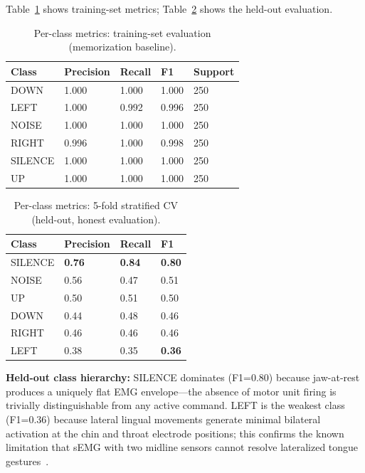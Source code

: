 \documentclass[11pt, a4paper]{article}
\begin{document}
Table~\ref{tab:perclass_train} shows training-set metrics; Table~\ref{tab:perclass_heldout} shows the held-out evaluation.

\begin{table}[h]
\centering
\caption{Per-class metrics: training-set evaluation (memorization baseline).}
\label{tab:perclass_train}
\begin{tabular}{@{}lllll@{}}
\toprule
Class & Precision & Recall & F1 & Support \\
\midrule
DOWN    & 1.000 & 1.000 & 1.000 & 250 \\
LEFT    & 1.000 & 0.992 & 0.996 & 250 \\
NOISE   & 1.000 & 1.000 & 1.000 & 250 \\
RIGHT   & 0.996 & 1.000 & 0.998 & 250 \\
SILENCE & 1.000 & 1.000 & 1.000 & 250 \\
UP      & 1.000 & 1.000 & 1.000 & 250 \\
\bottomrule
\end{tabular}
\end{table}

\begin{table}[h]
\centering
\caption{Per-class metrics: 5-fold stratified CV (held-out, honest evaluation).}
\label{tab:perclass_heldout}
\begin{tabular}{@{}llll@{}}
\toprule
Class & Precision & Recall & F1 \\
\midrule
SILENCE & \textbf{0.76} & \textbf{0.84} & \textbf{0.80} \\
NOISE   & 0.56 & 0.47 & 0.51 \\
UP      & 0.50 & 0.51 & 0.50 \\
DOWN    & 0.44 & 0.48 & 0.46 \\
RIGHT   & 0.46 & 0.46 & 0.46 \\
LEFT    & 0.38 & 0.35 & \textbf{0.36} \\
\bottomrule
\end{tabular}
\end{table}

\textbf{Held-out class hierarchy:} SILENCE dominates (F1=0.80) because jaw-at-rest produces a uniquely flat EMG envelope---the absence of motor unit firing is trivially distinguishable from any active command. LEFT is the weakest class (F1=0.36) because lateral lingual movements generate minimal bilateral activation at the chin and throat electrode positions; this confirms the known limitation that sEMG with two midline sensors cannot resolve lateralized tongue gestures~\cite{meltzner2017}.
\end{document}
